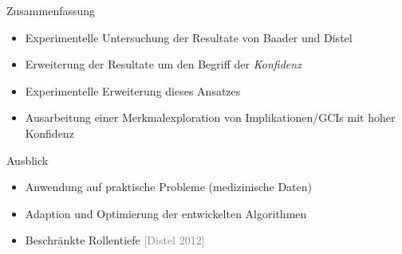 \documentclass[ngerman]{beamer}
\newcommand{\pseudocite}[1]{\textcolor{gray}{[#1]}}
\begin{document}
\begin{frame}

  \onslide<+->

  \begin{block}{Zusammenfassung}
    \begin{itemize}
    \item<+-> Experimentelle Untersuchung der Resultate von Baader und Distel
    \item<+-> Erweiterung der Resultate um den Begriff der \emph{Konfidenz}
    \item<+-> Experimentelle Erweiterung dieses Ansatzes
    \item<+-> Ausarbeitung einer Merkmalexploration von Implikationen/GCIs mit hoher
      Konfidenz
    \end{itemize}
  \end{block}

  \onslide<+->

  \begin{block}{Ausblick}
    \begin{itemize}
    \item<+-> Anwendung auf praktische Probleme (medizinische Daten)
    \item<+-> Adaption und Optimierung der entwickelten Algorithmen
    \item<+-> Beschränkte Rollentiefe \pseudocite{Distel 2012}
    \end{itemize}
  \end{block}
    
\end{frame}
\end{document}
